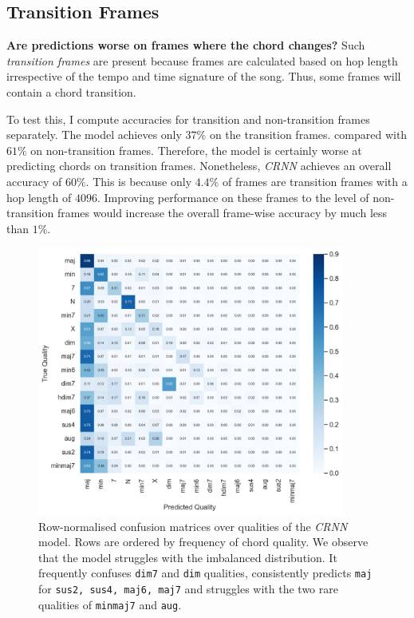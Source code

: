 \subsection{Transition Frames}\label{sec:transition_frames}

\textbf{Are predictions worse on frames where the chord changes?} Such \emph{transition frames} are present because frames are calculated based on hop length irrespective of the tempo and time signature of the song. Thus, some frames will contain a chord transition. 

To test this, I compute accuracies for transition and non-transition frames separately. The model achieves only $37\%$ on the transition frames. compared with $61\%$ on non-transition frames. Therefore, the model is certainly worse at predicting chords on transition frames. Nonetheless, \emph{CRNN} achieves an overall accuracy of $60\%$. This is because only $4.4\%$ of frames are transition frames with a hop length of $4096$. Improving performance on these frames to the level of non-transition frames would increase the overall frame-wise accuracy by much less than $1\%$. 

\begin{figure}[H]
    \centering
    \includegraphics[width=0.9\textwidth]{figures/confusion_matrix_qualities.png}
    \caption{Row-normalised confusion matrices over qualities of the \emph{CRNN} model. Rows are ordered by frequency of chord quality. We observe that the model struggles with the imbalanced distribution. It frequently confuses \texttt{dim7} and \texttt{dim} qualities, consistently predicts \texttt{maj} for \texttt{sus2, sus4, maj6, maj7} and struggles with the two rare qualities of \texttt{minmaj7} and \texttt{aug}.}\label{fig:crnn_qual_cm}
\end{figure}


